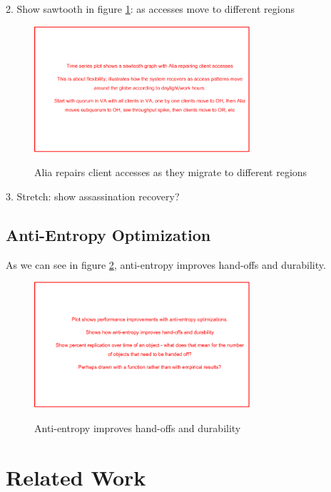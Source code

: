 \documentclass[sigplan,screen,review,anonymous,nonacm]{acmart}
\begin{document}
2. Show sawtooth in figure \ref{fig:sawtooth}: as accesses move to different regions 
\begin{figure}
\caption{Alia repairs client accesses as they migrate to different regions}
\centering
\includegraphics[width=8cm]{sawtooth-placeholder.png}
\label{fig:sawtooth}
\end{figure}

3. Stretch: show assassination recovery? 

\subsection{Anti-Entropy Optimization}


As we can see in figure \ref{fig:anti-entropy}, anti-entropy improves 
hand-offs and durability.

\begin{figure}
\caption{Anti-entropy improves hand-offs and durability}
\centering
\includegraphics[width=8cm]{anti-entropy-placeholder.png}
\label{fig:anti-entropy}
\end{figure}


\section{Related Work}
\end{document}
